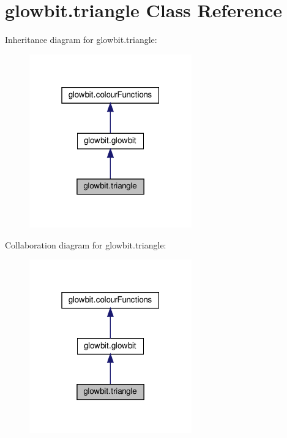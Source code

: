 \hypertarget{classglowbit_1_1triangle}{}\section{glowbit.\+triangle Class Reference}
\label{classglowbit_1_1triangle}


Inheritance diagram for glowbit.\+triangle\+:\nopagebreak
\begin{figure}[H]
\begin{center}
\leavevmode
\includegraphics[width=199pt]{classglowbit_1_1triangle__inherit__graph}
\end{center}
\end{figure}


Collaboration diagram for glowbit.\+triangle\+:\nopagebreak
\begin{figure}[H]
\begin{center}
\leavevmode
\includegraphics[width=199pt]{classglowbit_1_1triangle__coll__graph}
\end{center}
\end{figure}
